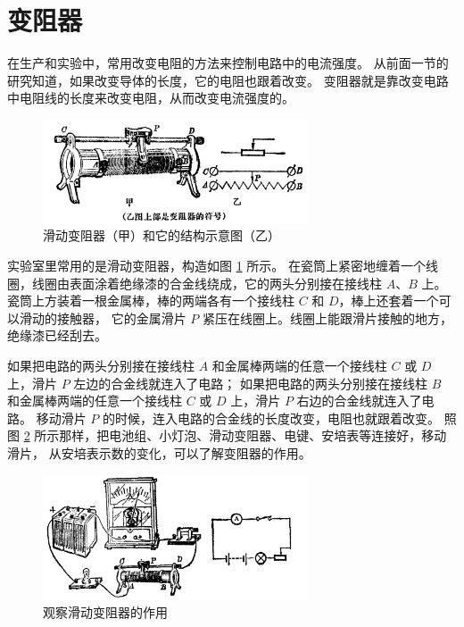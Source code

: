 \section{变阻器}\label{sec:8-10}

在生产和实验中，常用改变电阻的方法来控制电路中的电流强度。
从前面一节的研究知道，如果改变导体的长度，它的电阻也跟着改变。
变阻器就是靠改变电路中电阻线的长度来改变电阻，从而改变电流强度的。

\begin{figure}[htbp]
    \centering
    \includegraphics[width=0.7\textwidth]{../pic/czwl2-ch8-19}
    \caption{滑动变阻器（甲）和它的结构示意图（乙）}\label{fig:8-19}
\end{figure}

实验室里常用的是滑动变阻器，构造如图 \ref{fig:8-19} 所示。
在瓷筒上紧密地缠着一个线圈，线圈由表面涂着绝缘漆的合金线绕成，它的两头分别接在接线柱 $A$、$B$ 上。
瓷筒上方装着一根金属棒，棒的两端各有一个接线柱 $C$ 和 $D$，棒上还套着一个可以滑动的接触器，
它的金属滑片 $P$ 紧压在线圈上。线圈上能跟滑片接触的地方，绝缘漆已经刮去。

如果把电路的两头分别接在接线柱 $A$ 和金属棒两端的任意一个接线柱 $C$ 或 $D$ 上，滑片 $P$ 左边的合金线就连入了电路；
如果把电路的两头分别接在接线柱 $B$ 和金属棒两端的任意一个接线柱 $C$ 或 $D$ 上，滑片 $P$ 右边的合金线就连入了电路。
移动滑片 $P$ 的时候，连入电路的合金线的长度改变，电阻也就跟着改变。
照图 \ref{fig:8-20} 所示那样，把电池组、小灯泡、滑动变阻器、电键、安培表等连接好，移动滑片，
从安培表示数的变化，可以了解变阻器的作用。

\begin{figure}[htbp]
    \centering
    \includegraphics[width=0.7\textwidth]{../pic/czwl2-ch8-20}
    \caption{观察滑动变阻器的作用}\label{fig:8-20}
\end{figure}

